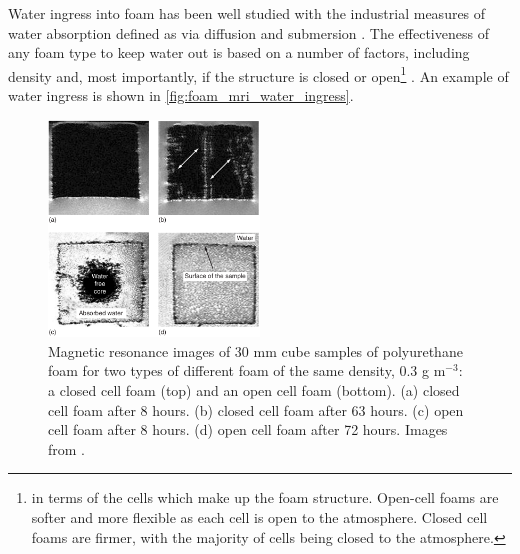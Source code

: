 

\par
Water ingress into foam has been well studied  with the industrial measures of water absorption defined as via diffusion and submersion \cite{foam_with_water_ref}.
The effectiveness of any foam type to keep water out is based on a number of factors, including density and, most importantly, if the structure is closed or open\footnote{in terms of the cells which make up the foam structure. Open-cell foams are softer and more flexible as each cell is open to the atmosphere. Closed cell foams are firmer, with the majority of cells being closed to the atmosphere.} \cite{mechanical_properties_of_foam_ref}.
An example of water ingress is shown in \autoref{fig:foam_mri_water_ingress}.


\begin{figure}[]
\includegraphics[width=0.5\textwidth]{Figures/NeutronCaptureTime/foam_water_absorption.png}
\centering
\caption{Magnetic resonance images of 30 mm cube samples of polyurethane foam for two types of different foam of the same density, 0.3 g m${}^{-3}$: a closed cell foam (top) and an open cell foam (bottom).
(a) closed cell foam after 8 hours. (b) closed cell foam after 63 hours.
(c) open cell foam after 8 hours. (d) open cell foam after 72 hours.
Images from \cite{foam_mri_data_ref}.
}
\label{fig:foam_mri_water_ingress}
\end{figure}



